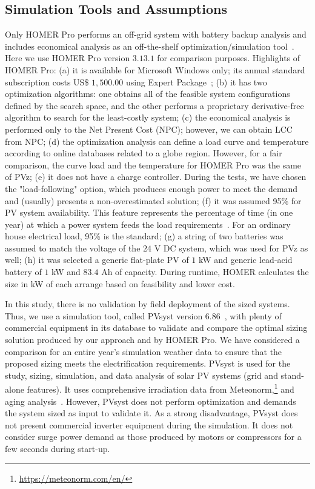 \documentclass[review]{elsarticle}
\begin{document}
\subsection{Simulation Tools and Assumptions}
\label{sec:SimulationToolsandAssumptions}

Only HOMER Pro performs an off-grid system with battery backup analysis and includes economical analysis as an off-the-shelf optimization/simulation tool~\citep{Pradhan,Swarnkar}. Here we use HOMER Pro version $3.13.1$ for comparison purposes. Highlights of HOMER Pro:
%
(a) it is available for Microsoft Windows only; its annual standard subscription costs US\$ $1,500.00$ using Expert Package~\citep{HOMER};
(b) it has two optimization algorithms: one obtains all of the feasible system configurations defined by the search space, and the other performs a proprietary derivative-free algorithm to search for the least-costly system;
(c) the economical analysis is performed only to the Net Present Cost (NPC); however, we can obtain LCC from NPC; 
(d) the optimization analysis can define a load curve and temperature according to online databases related to a globe region. However, for a fair comparison, the curve load and the temperature for HOMER Pro was the same of PVz; 
(e) it does not have a charge controller. During the tests, we have chosen the "load-following" option, which produces enough power to meet the demand~\citep{HOMER} and (usually) presents a non-overestimated solution; 
(f) it was assumed 95\% for PV system availability. This feature represents the percentage of time (in one year) at which a power system feeds the load requirements~\citep{Khatib2014}. For an ordinary house electrical load, 95\% is the standard;
(g) a string of two batteries was assumed to match the voltage of the $24$ V DC system, which was used for PVz as well; 
(h) it was selected a generic flat-plate PV of $1$ kW and generic lead-acid battery of $1$ kW and $83.4$ Ah of capacity. During runtime, HOMER calculates the size in kW of each arrange based on feasibility and lower cost.

In this study, there is no validation by field deployment of the sized systems. Thus, we use a simulation tool, called PVsyst version $6.86$~\citep{PVsyst}, with plenty of commercial equipment in its database to validate and compare the optimal sizing solution produced by our approach and by HOMER Pro. We have considered a comparison for an entire year's simulation weather data to ensure that the proposed sizing meets the electrification requirements. PVsyst is used for the study, sizing, simulation, and data analysis of solar PV systems (grid and stand-alone features). It uses comprehensive irradiation data from Meteonorm,\footnote{\href{https://meteonorm.com/en/}{https://meteonorm.com/en/}} and aging analysis~\citep{PVsyst2017}. However, PVsyst does not perform optimization and demands the system sized as input to validate it. As a strong disadvantage, PVsyst does not present commercial inverter equipment during the simulation. It does not consider surge power demand as those produced by motors or compressors for a few seconds during start-up. 
\end{document}
